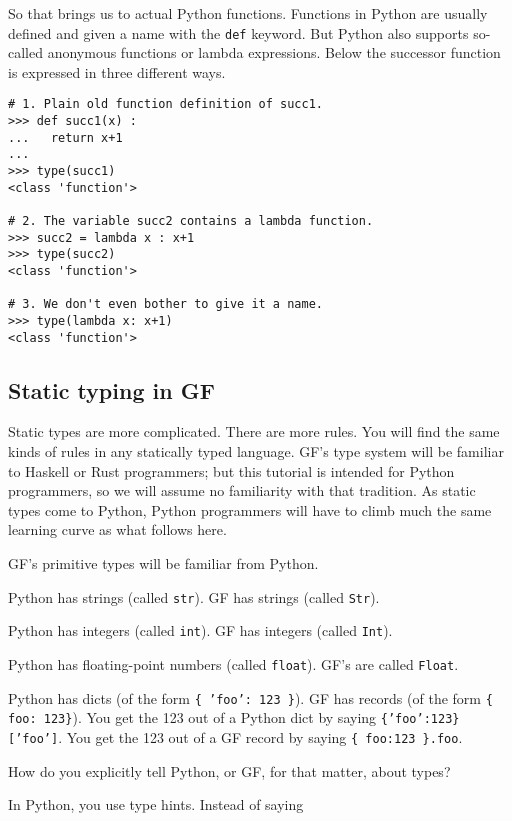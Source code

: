 \documentclass{scrartcl}
\begin{document}
So that brings us to actual Python functions. Functions in Python are usually defined and given a name with the \texttt{def} keyword. But Python also supports so-called anonymous functions or lambda expressions. Below the successor function is expressed in three different ways.

\begin{verbatim}
# 1. Plain old function definition of succ1.
>>> def succ1(x) :
...   return x+1
... 
>>> type(succ1)
<class 'function'>

# 2. The variable succ2 contains a lambda function.
>>> succ2 = lambda x : x+1
>>> type(succ2)
<class 'function'>

# 3. We don't even bother to give it a name.
>>> type(lambda x: x+1)
<class 'function'>
\end{verbatim}

\subsection{Static typing in GF}

Static types are more complicated. There are more rules. You will find the same kinds of rules in any statically typed language. GF's type system will be familiar to Haskell or Rust programmers; but this tutorial is intended for Python programmers, so we will assume no familiarity with that tradition. As static types come to Python, Python programmers will have to climb much the same learning curve as what follows here.

GF's primitive types will be familiar from Python.

Python has strings (called \texttt{str}). GF has strings (called \texttt{Str}).

Python has integers (called \texttt{int}). GF has integers (called \texttt{Int}).

Python has floating-point numbers (called \texttt{float}). GF's are called \texttt{Float}.

Python has dicts (of the form \texttt{\{ 'foo': 123 \}}). GF has records (of the form \texttt{\{ foo: 123\}}). You get the 123 out of a Python dict by saying \texttt{\{'foo':123\}['foo']}. You get the 123 out of a GF record by saying \texttt{\{ foo:123 \}.foo}.


How do you explicitly tell Python, or GF, for that matter, about types?

In Python, you use type hints. Instead of saying
\end{document}

